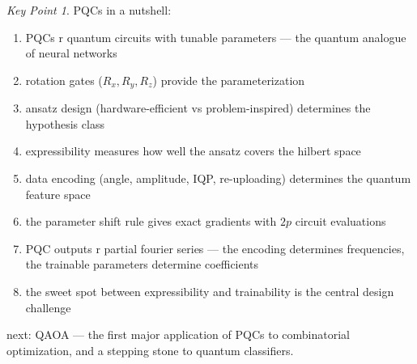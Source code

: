 \documentclass[11pt,a4paper]{article}
\theoremstyle{definition}
\theoremstyle{remark}
\newtheorem*{keypoint}{Key Point}
\begin{document}
\begin{keypoint}
PQCs in a nutshell:
\begin{enumerate}
    \item PQCs r quantum circuits with tunable parameters --- the quantum analogue of neural networks
    \item rotation gates ($R_x, R_y, R_z$) provide the parameterization
    \item ansatz design (hardware-efficient vs problem-inspired) determines the hypothesis class
    \item expressibility measures how well the ansatz covers the hilbert space
    \item data encoding (angle, amplitude, IQP, re-uploading) determines the quantum feature space
    \item the parameter shift rule gives exact gradients with $2p$ circuit evaluations
    \item PQC outputs r partial fourier series --- the encoding determines frequencies, the trainable parameters determine coefficients
    \item the sweet spot between expressibility and trainability is the central design challenge
\end{enumerate}
next: QAOA --- the first major application of PQCs to combinatorial optimization, and a stepping stone to quantum classifiers.
\end{keypoint}
\end{document}
